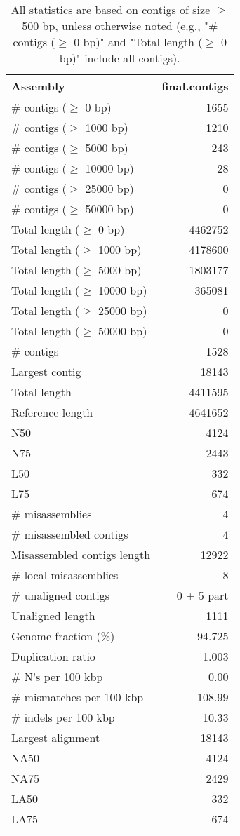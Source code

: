 \documentclass[12pt,a4paper]{article}
\begin{document}
\begin{table}[ht]
\begin{center}
\caption{All statistics are based on contigs of size $\geq$ 500 bp, unless otherwise noted (e.g., "\# contigs ($\geq$ 0 bp)" and "Total length ($\geq$ 0 bp)" include all contigs).}
\begin{tabular}{|l*{1}{|r}|}
\hline
Assembly & final.contigs \\ \hline
\# contigs ($\geq$ 0 bp) & 1655 \\ \hline
\# contigs ($\geq$ 1000 bp) & 1210 \\ \hline
\# contigs ($\geq$ 5000 bp) & 243 \\ \hline
\# contigs ($\geq$ 10000 bp) & 28 \\ \hline
\# contigs ($\geq$ 25000 bp) & 0 \\ \hline
\# contigs ($\geq$ 50000 bp) & 0 \\ \hline
Total length ($\geq$ 0 bp) & 4462752 \\ \hline
Total length ($\geq$ 1000 bp) & 4178600 \\ \hline
Total length ($\geq$ 5000 bp) & 1803177 \\ \hline
Total length ($\geq$ 10000 bp) & 365081 \\ \hline
Total length ($\geq$ 25000 bp) & 0 \\ \hline
Total length ($\geq$ 50000 bp) & 0 \\ \hline
\# contigs & 1528 \\ \hline
Largest contig & 18143 \\ \hline
Total length & 4411595 \\ \hline
Reference length & 4641652 \\ \hline
N50 & 4124 \\ \hline
N75 & 2443 \\ \hline
L50 & 332 \\ \hline
L75 & 674 \\ \hline
\# misassemblies & 4 \\ \hline
\# misassembled contigs & 4 \\ \hline
Misassembled contigs length & 12922 \\ \hline
\# local misassemblies & 8 \\ \hline
\# unaligned contigs & 0 + 5 part \\ \hline
Unaligned length & 1111 \\ \hline
Genome fraction (\%) & 94.725 \\ \hline
Duplication ratio & 1.003 \\ \hline
\# N's per 100 kbp & 0.00 \\ \hline
\# mismatches per 100 kbp & 108.99 \\ \hline
\# indels per 100 kbp & 10.33 \\ \hline
Largest alignment & 18143 \\ \hline
NA50 & 4124 \\ \hline
NA75 & 2429 \\ \hline
LA50 & 332 \\ \hline
LA75 & 674 \\ \hline
\end{tabular}
\end{center}
\end{table}
\end{document}
